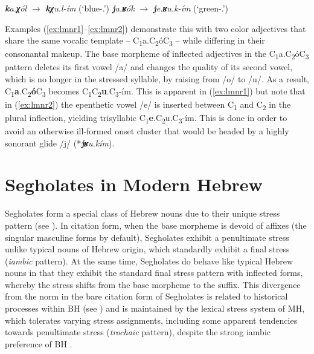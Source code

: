 \begin{exe} 
\ex \emph{\textbf{k}a.\textbf{χ}ól} $\to$ \emph{\textbf{kχ}u.l-ím} (`blue-\Pl{}.\M{}') \label{ex:lmnr1} 
\ex \emph{\textbf{j}a.\textbf{ʁ}ók} $\to$ \emph{\textbf{j}e.\textbf{ʁ}u.k-ím} (`green-\Pl{}.\M{}') \label{ex:lmnr2}
\end{exe}

Examples (\ref{ex:lmnr1}--\ref{ex:lmnr2}) demonstrate this with two color adjectives that share the same vocalic template -- C\textsubscript{1}a.C\textsubscript{2}óC\textsubscript{3} -- while differing in their consonantal makeup. The base morpheme of inflected adjectives in the C\textsubscript{1}a.C\textsubscript{2}óC\textsubscript{3} pattern deletes its first vowel /a/ and changes the quality of its second vowel, which is no longer in the stressed syllable, by raising from /o/ to /u/. As a result, C\textsubscript{1}\textbf{a}.C\textsubscript{2}\textbf{ó}C\textsubscript{3} becomes C\textsubscript{1}C\textsubscript{2}\textbf{u}.C\textsubscript{3}-ím.
This is apparent in (\ref{ex:lmnr1}) but note that in (\ref{ex:lmnr2}) the epenthetic vowel /e/ is inserted between C\textsubscript{1} and C\textsubscript{2} in the plural inflection, yielding trisyllabic C\textsubscript{1}\textbf{e}.C\textsubscript{2}u.C\textsubscript{3}-ím. This is done in order to avoid an otherwise ill-formed onset cluster that would be headed by a highly sonorant glide /j/ (*\emph{\textbf{jʁ}u.kím}).

\section{Segholates in Modern Hebrew}\label{sec:segholatesinmh}

Segholates form a special class of Hebrew nouns due to their unique stress pattern (see \citealt{bat2012prosodicsk}). In citation form, when the base morpheme is devoid of affixes (the singular masculine forms by default), Segholates exhibit a penultimate stress unlike typical nouns of Hebrew origin, which standardly exhibit a final stress (\emph{iambic} pattern). At the same time, Segholates do behave like typical Hebrew nouns in that they exhibit the standard final stress pattern with inflected forms, whereby the stress shifts from the base morpheme to the suffix. This divergence from the norm in the bare citation form of Segholates is related to historical processes within BH (see \citealt{yeverechyahu2020biblicalsk}) and is maintained by the lexical stress system of MH, which tolerates varying stress assignments, including some apparent tendencies towards penultimate stress (\emph{trochaic} pattern), despite the strong iambic preference of BH \citep{batel2005phonologysk}.


